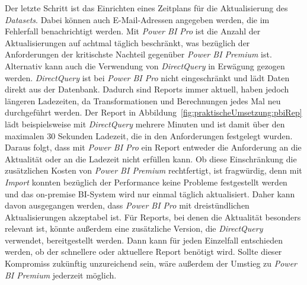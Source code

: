 Der letzte Schritt ist das Einrichten eines Zeitplans für die Aktualisierung des \textit{Datasets}. Dabei können auch E-Mail-Adressen angegeben werden, die im Fehlerfall benachrichtigt werden. Mit \textit{Power BI Pro} ist die Anzahl der Aktualisierungen auf achtmal täglich beschränkt, was bezüglich der Anforderungen der kritischste Nachteil gegenüber \textit{Power BI Premium} ist. Alternativ kann auch die Verwendung von \textit{DirectQuery} in Erwägung gezogen werden. \textit{DirectQuery} ist bei \textit{Power BI Pro} nicht eingeschränkt und lädt Daten direkt aus der Datenbank. Dadurch sind Reports immer aktuell, haben jedoch längeren Ladezeiten, da Transformationen und Berechnungen jedes Mal neu durchgeführt werden. Der Report in Abbildung~\ref{fig:praktischeUmsetzung:pbiRep} lädt beispielsweise mit \textit{DirectQuery} mehrere Minuten und ist damit über den maximalen 30 Sekunden Ladezeit, die in den Anforderungen festgelegt wurden. Daraus folgt, dass mit \textit{Power BI Pro} ein Report entweder die Anforderung an die Aktualität oder an die Ladezeit nicht erfüllen kann. Ob diese Einschränkung die zusätzlichen Kosten von \textit{Power BI Premium} rechtfertigt, ist fragwürdig, denn mit \textit{Import} konnten bezüglich der Performance keine Probleme festgestellt werden und das on-premise BI-System wird nur einmal täglich aktualisiert. Daher kann davon ausgegangen werden, dass \textit{Power BI Pro} mit dreistündlichen Aktualisierungen akzeptabel ist. Für Reports, bei denen die Aktualität besonders relevant ist, könnte außerdem eine zusätzliche Version, die \textit{DirectQuery} verwendet, bereitgestellt werden. Dann kann für jeden Einzelfall entschieden werden, ob der schnellere oder aktuellere Report benötigt wird. Sollte dieser Kompromiss zukünftig unzureichend sein, wäre außerdem der Umstieg zu \textit{Power BI Premium} jederzeit möglich.

\cite[vgl.][]{pearson_pro_2020}

